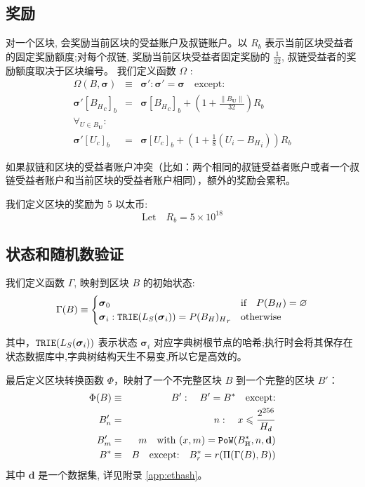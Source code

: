 \documentclass[9pt,oneside]{amsart}
\newcommand{\hcancel}[1]{%
    \tikz[baseline=(tocancel.base)]{
        \node[inner sep=0pt,outer sep=0pt] (tocancel) {#1};
        \draw[black] (tocancel.south west) -- (tocancel.north east);
    }%
}%
\begin{document}
\begin{multicols}{2}
\subsection{奖励}
对一个区块, 会奖励当前区块的受益账户及叔链账户。以 $R_b$ 表示当前区块受益者的固定奖励额度;对每个叔链, 奖励当前区块受益者固定奖励的 $\frac{1}{32}$, 叔链受益者的奖励额度取决于区块编号。 我们定义函数 \hyperlink{Omega}{$\Omega$} :
\begin{eqnarray}
\Omega(B, \boldsymbol{\sigma}) & \equiv & \boldsymbol{\sigma}': \boldsymbol{\sigma}' = \boldsymbol{\sigma} \quad \text{except:} \\
\boldsymbol{\sigma}'[{B_H}_c]_b & = & \boldsymbol{\sigma}[{B_H}_c]_b + (1 + \frac{\lVert B_\mathbf{U}\rVert}{32})R_b \\
\forall_{U \in B_\mathbf{U}}: \\ \nonumber
 \boldsymbol{\sigma}'[U_c]_b & = & \boldsymbol{\sigma}[U_c]_b + (1 + \frac{1}{8} (U_i - {B_H}_i)) R_b
\end{eqnarray}

如果叔链和区块的受益者账户冲突（比如：两个相同的叔链受益者账户或者一个叔链受益者账户和当前区块的受益者账户相同），额外的奖励会累积。

我们定义区块的奖励为 5 以太币:
\begin{equation}
\text{Let} \quad R_b = 5 \times 10^{18}
\end{equation}

\subsection{状态和随机数验证}\label{sec:statenoncevalidation}

我们定义函数 $\Gamma$, 映射到区块 \hyperlink{block}{$B$} 的初始状态:
\begin{equation}
\Gamma(B) \equiv \begin{cases}
\boldsymbol{\sigma}_0 & \text{if} \quad P(B_H) = \varnothing \\
\boldsymbol{\sigma}_i: \mathtt{\small TRIE}(L_{S}(\boldsymbol{\sigma}_i)) = {P(B_H)_H}_r & \text{otherwise}
\end{cases}
\end{equation}

其中，$\mathtt{\small TRIE}(L_{S}(\boldsymbol{\sigma}_i))$ 表示状态 $\boldsymbol{\sigma}_i$ 对应字典树根节点的哈希;执行时会将其保存在状态数据库中,字典树结构天生不易变,所以它是高效的。

最后定义区块转换函数 $\Phi$，映射了一个不完整区块 \hyperlink{block}{$B$} 到一个完整的区块 $B'$：
\begin{eqnarray}
\Phi(B) & \equiv & B': \quad B' = B^* \quad \text{except:} \\
B'_n & = & n: \quad x \leqslant \frac{2^{256}}{H_d} \\
B'_m & = & m \quad \text{with } (x, m) = \mathtt{PoW}(B^*_{\hcancel{n}}, n, \mathbf{d}) \\
B^* & \equiv & B \quad \text{except:} \quad B^*_r = r(\Pi(\Gamma(B), B))
\end{eqnarray}
其中 $\mathbf{d}$ 是一个数据集, 详见附录 \ref{app:ethash}。


\end{multicols}
\end{document}
